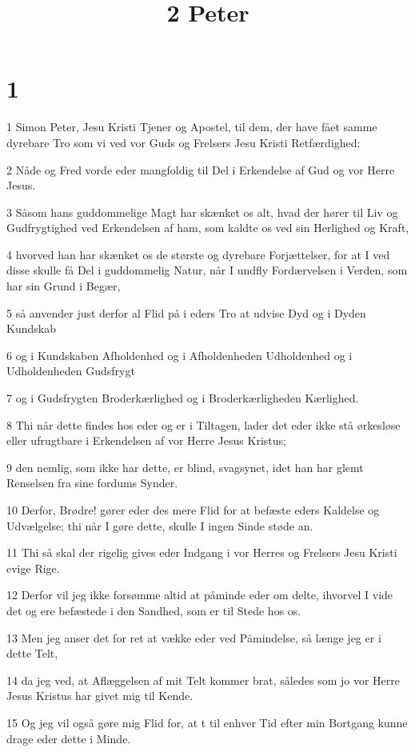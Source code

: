 

\title{2 Peter}


\chapter{1}

\par 1 Simon Peter, Jesu Kristi Tjener og Apostel, til dem, der have fået samme dyrebare Tro som vi ved vor Guds og Frelsers Jesu Kristi Retfærdighed:
\par 2 Nåde og Fred vorde eder mangfoldig til Del i Erkendelse af Gud og vor Herre Jesus.
\par 3 Såsom hans guddommelige Magt har skænket os alt, hvad der hører til Liv og Gudfrygtighed ved Erkendelsen af ham, som kaldte os ved sin Herlighed og Kraft,
\par 4 hvorved han har skænket os de største og dyrebare Forjættelser, for at I ved disse skulle få Del i guddommelig Natur, når I undfly Fordærvelsen i Verden, som har sin Grund i Begær,
\par 5 så anvender just derfor al Flid på i eders Tro at udvise Dyd og i Dyden Kundskab
\par 6 og i Kundskaben Afholdenhed og i Afholdenheden Udholdenhed og i Udholdenheden Gudsfrygt
\par 7 og i Gudsfrygten Broderkærlighed og i Broderkærligheden Kærlighed.
\par 8 Thi når dette findes hos eder og er i Tiltagen, lader det eder ikke stå ørkesløse eller ufrugtbare i Erkendelsen af vor Herre Jesus Kristus;
\par 9 den nemlig, som ikke har dette, er blind, svagsynet, idet han har glemt Renselsen fra sine fordums Synder.
\par 10 Derfor, Brødre! gører eder des mere Flid for at befæste eders Kaldelse og Udvælgelse; thi når I gøre dette, skulle I ingen Sinde støde an.
\par 11 Thi så skal der rigelig gives eder Indgang i vor Herres og Frelsers Jesu Kristi evige Rige.
\par 12 Derfor vil jeg ikke forsømme altid at påminde eder om delte, ihvorvel I vide det og ere befæstede i den Sandhed, som er til Stede hos os.
\par 13 Men jeg anser det for ret at vække eder ved Påmindelse, så længe jeg er i dette Telt,
\par 14 da jeg ved, at Aflæggelsen af mit Telt kommer brat, således som jo vor Herre Jesus Kristus har givet mig til Kende.
\par 15 Og jeg vil også gøre mig Flid for, at t til enhver Tid efter min Bortgang kunne drage eder dette i Minde.
